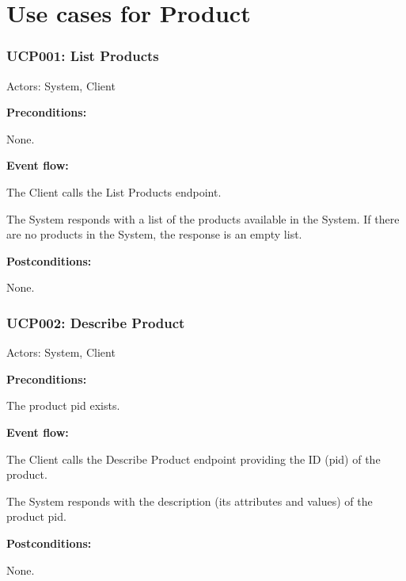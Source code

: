\section{Use cases for Product}

\begin{ucbox}{\subsubsection{UCP001: List Products}}
\label{UCP001}

Actors: System, Client

\textbf{Preconditions:}

\ucitem None.

\textbf{Event flow:}

\ucitem The Client calls the List Products endpoint.

\ucitem The System responds with a list of the products available in the System. If there are no products in the System, the response is an empty list.

\textbf{Postconditions:}

\ucitem None.

\end{ucbox}

\begin{ucbox}{\subsubsection{UCP002: Describe Product}}
\label{UCP002}

Actors: System, Client

\textbf{Preconditions:} 

\ucitem The product pid exists.

\textbf{Event flow:}

\ucitem The Client calls the Describe Product endpoint providing the ID (pid) of the product.

\ucitem The System responds with the description (its attributes and values) of the product pid.

\textbf{Postconditions:}

\ucitem None.

\end{ucbox}

